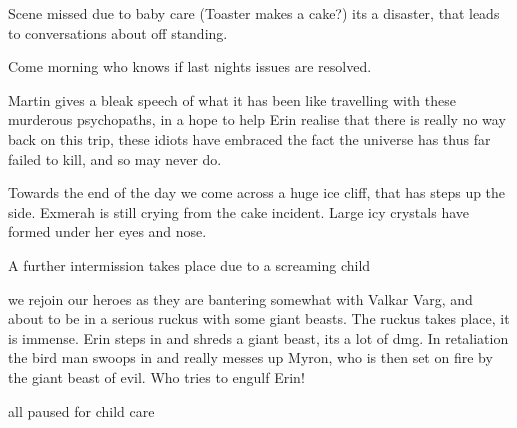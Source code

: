 Scene missed due to baby care (Toaster makes a cake?) its a disaster, that leads to conversations about off standing.\medskip

Come morning who knows if last nights issues are resolved.\medskip

Martin gives a bleak speech of what it has been like travelling with these murderous psychopaths, in a hope to help Erin realise that there is really no way back on this trip, these idiots have embraced the fact the universe has thus far failed to kill, and so may never do.\medskip

Towards the end of the day we come across a huge ice cliff, that has steps up the side. Exmerah is still crying from the cake incident. Large icy crystals have formed under her eyes and nose.\medskip

A further intermission takes place due to a screaming child\medskip

we rejoin our heroes as they are bantering somewhat with Valkar Varg, and about to be in a serious ruckus with some giant beasts. The ruckus takes place, it is immense. Erin steps in and shreds a giant beast, its a lot of dmg. In retaliation the bird man swoops in and really messes up Myron, who is then set on fire by the giant beast of evil. Who tries to engulf Erin!\medskip

all paused for child care\medskip

\vspace*{5mm}
